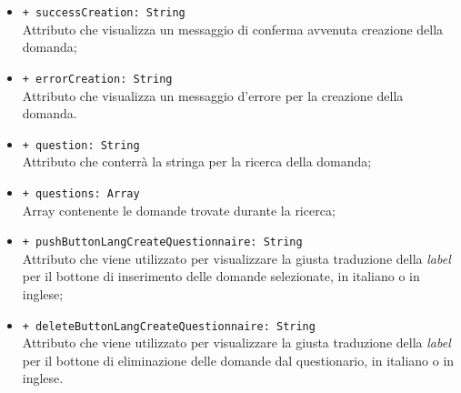 \begin{itemize}
\begin{itemize}
			\item \texttt{+ successCreation: String} \\ Attributo che visualizza un messaggio di conferma avvenuta creazione della domanda;
			\item \texttt{+ errorCreation: String} \\ Attributo che visualizza un messaggio d'errore per la creazione della domanda.
			\item \texttt{+ question: String} \\ Attributo che conterrà la stringa per la ricerca della domanda;
			\item \texttt{+ questions: Array} \\ Array contenente le domande trovate durante la ricerca;
			\item \texttt{+ pushButtonLangCreateQuestionnaire: String} \\ Attributo che viene utilizzato per visualizzare la giusta traduzione della \textit{label} per il bottone di inserimento delle domande selezionate, in italiano o in inglese;
			\item \texttt{+ deleteButtonLangCreateQuestionnaire: String} \\ Attributo che viene utilizzato per visualizzare la giusta traduzione della \textit{label} per il bottone di eliminazione delle domande dal questionario, in italiano o in inglese.
		\end{itemize}
\end{itemize}